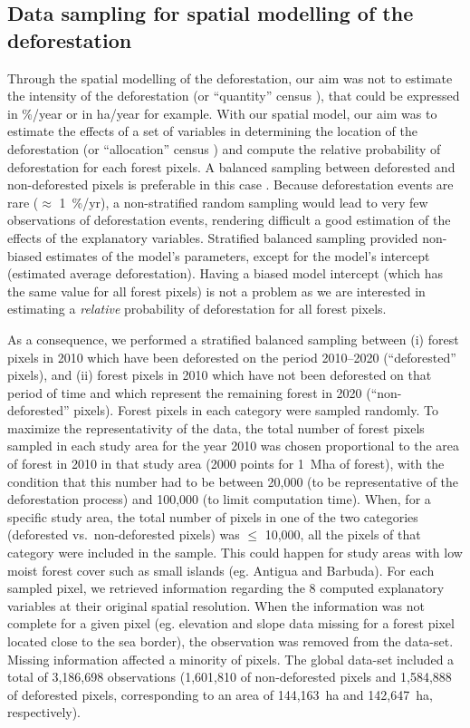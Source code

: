 \documentclass[12pt,]{article}
\begin{document}
\hypertarget{data-sampling-for-spatial-modelling-of-the-deforestation}{%
\subsection{Data sampling for spatial modelling of the deforestation}\label{data-sampling-for-spatial-modelling-of-the-deforestation}}

Through the spatial modelling of the deforestation, our aim was not to estimate the intensity of the deforestation (or ``quantity'' census \citet{Pontius2011}), that could be expressed in \%/year or in ha/year for example. With our spatial model, our aim was to estimate the effects of a set of variables in determining the location of the deforestation (or ``allocation'' census \citet{Pontius2011}) and compute the relative probability of deforestation for each forest pixels. A balanced sampling between deforested and non-deforested pixels is preferable in this case \citep{Dezecache2017, Vieilledent2013}. Because deforestation events are rare (\(\approx\) 1~\%/yr), a non-stratified random sampling would lead to very few observations of deforestation events, rendering difficult a good estimation of the effects of the explanatory variables. Stratified balanced sampling provided non-biased estimates of the model's parameters, except for the model's intercept (estimated average deforestation). Having a biased model intercept (which has the same value for all forest pixels) is not a problem as we are interested in estimating a \emph{relative} probability of deforestation for all forest pixels.

As a consequence, we performed a stratified balanced sampling between (i) forest pixels in 2010 which have been deforested on the period 2010--2020 (``deforested'' pixels), and (ii) forest pixels in 2010 which have not been deforested on that period of time and which represent the remaining forest in 2020 (``non-deforested'' pixels). Forest pixels in each category were sampled randomly. To maximize the representativity of the data, the total number of forest pixels sampled in each study area for the year 2010 was chosen proportional to the area of forest in 2010 in that study area (2000 points for 1~Mha of forest), with the condition that this number had to be between 20,000 (to be representative of the deforestation process) and 100,000 (to limit computation time). When, for a specific study area, the total number of pixels in one of the two categories (deforested vs.~non-deforested pixels) was \(\leq\) 10,000, all the pixels of that category were included in the sample. This could happen for study areas with low moist forest cover such as small islands (eg. Antigua and Barbuda). For each sampled pixel, we retrieved information regarding the 8 computed explanatory variables at their original spatial resolution. When the information was not complete for a given pixel (eg. elevation and slope data missing for a forest pixel located close to the sea border), the observation was removed from the data-set. Missing information affected a minority of pixels. The global data-set included a total of 3,186,698 observations (1,601,810 of non-deforested pixels and 1,584,888 of deforested pixels, corresponding to an area of 144,163~ha and 142,647~ha, respectively).
\end{document}
